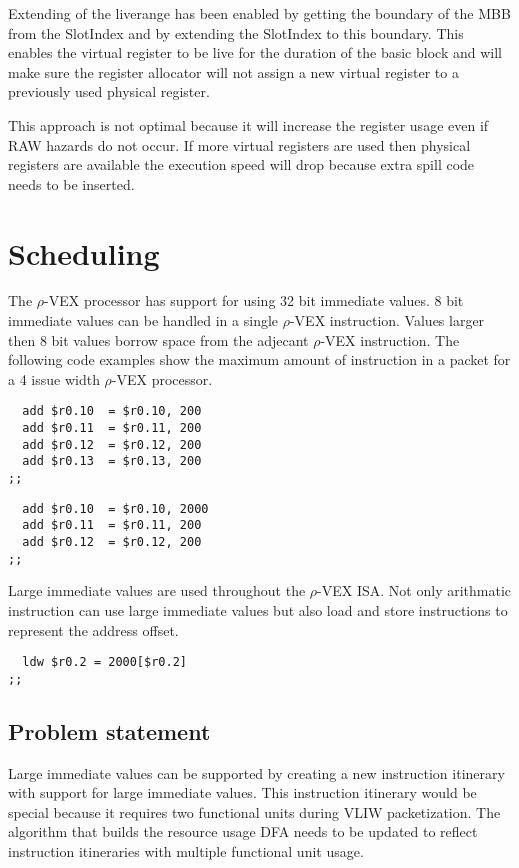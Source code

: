 Extending of the liverange has been enabled by getting the boundary of the MBB from the SlotIndex and by extending the SlotIndex to this boundary. This enables the virtual register to be live for the duration of the basic block and will make sure the register allocator will not assign a new virtual register to a previously used physical register.

This approach is not optimal because it will increase the register usage even if RAW hazards do not occur. If more virtual registers are used then physical registers are available the execution speed will drop because extra spill code needs to be inserted.

\section{Scheduling}
The $\rho$-VEX processor has support for using 32 bit immediate values. 8 bit immediate values can be handled in a single $\rho$-VEX instruction. Values larger then 8 bit values borrow space from the adjecant $\rho$-VEX instruction. The following code examples show the maximum amount of instruction in a packet for a 4 issue width $\rho$-VEX processor.

\begin{lstlisting}
  add $r0.10  = $r0.10, 200
  add $r0.11  = $r0.11, 200
  add $r0.12  = $r0.12, 200
  add $r0.13  = $r0.13, 200
;;
\end{lstlisting}

\begin{lstlisting}
  add $r0.10  = $r0.10, 2000
  add $r0.11  = $r0.11, 200
  add $r0.12  = $r0.12, 200
;;
\end{lstlisting}

Large immediate values are used throughout the $\rho$-VEX ISA. Not only arithmatic instruction can use large immediate values but also load and store instructions to represent the address offset.

\begin{lstlisting}
  ldw $r0.2 = 2000[$r0.2]
;;
\end{lstlisting}

\subsection{Problem statement} %
\label{sub:problem_statement}
Large immediate values can be supported by creating a new instruction itinerary with support for large immediate values. This instruction itinerary would be special because it requires two functional units during VLIW packetization. The algorithm that builds the resource usage DFA needs to be updated to reflect instruction itineraries with multiple functional unit usage.

